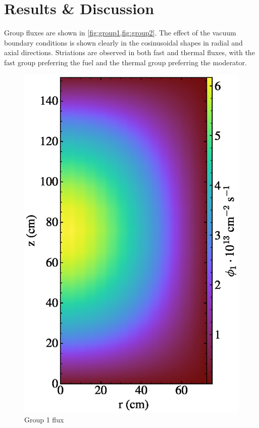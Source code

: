 \documentclass{article}
\let\Oldsection\section
\renewcommand{\section}{\FloatBarrier\Oldsection}
\begin{document}
\section{Results \& Discussion}

Group fluxes are shown in \cref{fig:group1,fig:group2}. The effect of the vacuum
boundary conditions is shown clearly in the cosinusoidal shapes in radial and
axial directions. Striations are observed in both fast and thermal fluxes, with
the fast group preferring the fuel and the thermal group preferring the moderator.

\begin{figure}
  \centering
  \includegraphics{auto_diff_rho_group1.eps}
  \caption{Group 1 flux}
  \label{fig:group1}
\end{figure}
\end{document}
